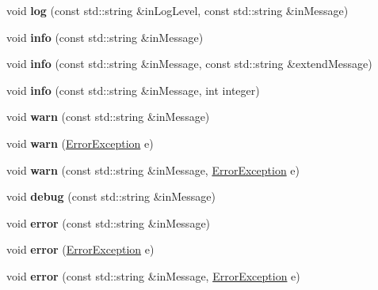 \begin{DoxyCompactItemize}
\item 
\mbox{\label{classLogger_a2e4b4c867ecfe260bc1f4d218806810c}} 
void {\bfseries log} (const std\+::string \&in\+Log\+Level, const std\+::string \&in\+Message)
\item 
\mbox{\label{classLogger_a5cde5c21cb6934b132eaf8261b53e402}} 
void {\bfseries info} (const std\+::string \&in\+Message)
\item 
\mbox{\label{classLogger_a7cc462a7598d311aa4f2ec4fe518b93f}} 
void {\bfseries info} (const std\+::string \&in\+Message, const std\+::string \&extend\+Message)
\item 
\mbox{\label{classLogger_ac4e95734a63d169fcef24210f559693a}} 
void {\bfseries info} (const std\+::string \&in\+Message, int integer)
\item 
\mbox{\label{classLogger_ad1933a0621041f405973dded2410cbc0}} 
void {\bfseries warn} (const std\+::string \&in\+Message)
\item 
\mbox{\label{classLogger_ae533d83005cf0a3d7f51a16840fc018a}} 
void {\bfseries warn} (\hyperlink{structErrorException}{Error\+Exception} e)
\item 
\mbox{\label{classLogger_aeb984c2ca90a8aca582e647b249733e7}} 
void {\bfseries warn} (const std\+::string \&in\+Message, \hyperlink{structErrorException}{Error\+Exception} e)
\item 
\mbox{\label{classLogger_a32a06234fc70ea5fb75f32b26cea4483}} 
void {\bfseries debug} (const std\+::string \&in\+Message)
\item 
\mbox{\label{classLogger_a0cd03a1667644704c93c30c52176a87c}} 
void {\bfseries error} (const std\+::string \&in\+Message)
\item 
\mbox{\label{classLogger_a0e554d398ab4ed57a651dceca352ddd3}} 
void {\bfseries error} (\hyperlink{structErrorException}{Error\+Exception} e)
\item 
\mbox{\label{classLogger_a6f80f9061863ffe36007bc661e6d9f45}} 
void {\bfseries error} (const std\+::string \&in\+Message, \hyperlink{structErrorException}{Error\+Exception} e)
\end{DoxyCompactItemize}
